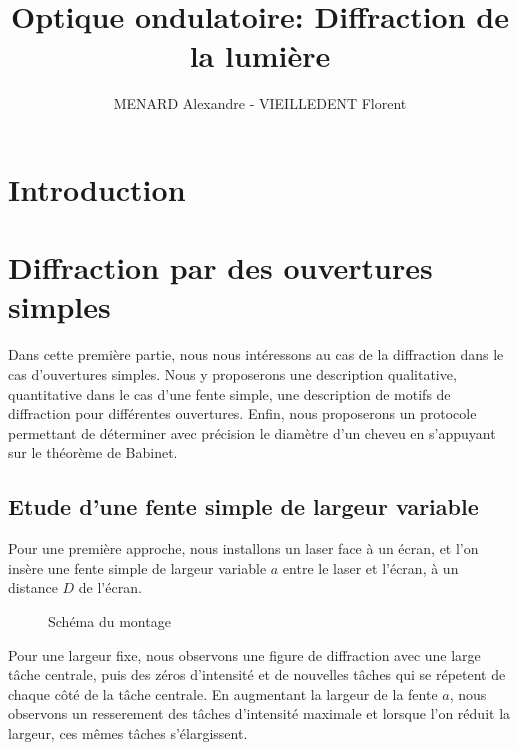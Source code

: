 \documentclass[12pt]{article}
\title{\textbf{Optique ondulatoire:} Diffraction de la lumière}
\author{MENARD Alexandre - VIEILLEDENT Florent}
\begin{document}
\maketitle

\section*{Introduction}

\break
\section{Diffraction par des ouvertures simples}
Dans cette première partie, nous nous intéressons au cas de la diffraction dans le cas d'ouvertures simples. Nous y proposerons une description qualitative, quantitative dans le cas d'une fente simple,
une description de motifs de diffraction pour différentes ouvertures. Enfin, nous proposerons un protocole permettant de déterminer avec précision le diamètre d'un cheveu en s'appuyant sur le théorème de Babinet.
\subsection{Etude d'une fente simple de largeur variable}
Pour une première approche, nous installons un laser face à un écran, et l'on insère une fente simple de largeur variable $a$ entre le laser et l'écran, à un distance $D$ de l'écran.
\begin{figure}[!h]
    \begin{center}
        \resizebox{0.7\textwidth}{5cm}{
        
        }
    \end{center}
    \caption{Schéma du montage}
\end{figure}

Pour une largeur fixe, nous observons une figure de diffraction avec une large tâche centrale, puis des zéros d'intensité et de nouvelles tâches qui se répetent de chaque côté de la tâche centrale.
En augmentant la largeur de la fente $a$, nous observons un resserement des tâches d'intensité maximale et lorsque l'on réduit la largeur, ces mêmes tâches s'élargissent.
\end{document}
